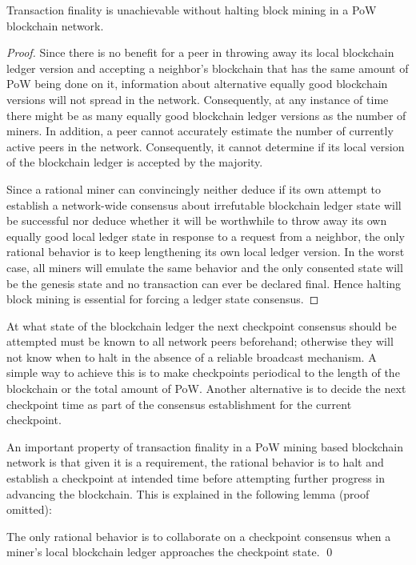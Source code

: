 \begin{lemma}
\label{l-halt}
Transaction finality is unachievable without halting block mining in a PoW blockchain network.  
\end{lemma}

\begin{proof}
Since there is no benefit for a peer in throwing away its local blockchain ledger version and accepting a neighbor's blockchain that has the same amount of PoW being done on it, information about alternative equally good blockchain versions will not spread in the network. Consequently, at any instance of time there might be as many equally good blockchain ledger versions as the number of miners. In addition, a peer cannot accurately estimate the number of currently active peers in the network. Consequently, it cannot determine if its local version of the blockchain ledger is accepted by the majority. 

Since a rational miner can convincingly neither deduce if its own attempt to establish a network-wide consensus about irrefutable blockchain ledger state will be successful nor deduce whether it will be worthwhile to throw away its own equally good local ledger state in response to a request from a neighbor, the only rational behavior is to keep lengthening its own local ledger version. In the worst case, all miners will emulate the same behavior and the only consented state will be the genesis state and no transaction can ever be declared final. Hence halting block mining is essential for forcing a ledger state consensus.             
\end{proof}                

At what state of the blockchain ledger the next checkpoint consensus should be attempted must be known to all network peers beforehand; otherwise they will not know when to halt in the absence of a reliable broadcast mechanism. A simple way to achieve this is to make checkpoints periodical to the length of the blockchain or the total amount of PoW. Another alternative is to decide the next checkpoint time as part of the consensus establishment for the current checkpoint.    

An important property of transaction finality in a PoW mining based blockchain network is that given it is a requirement, the rational behavior is to halt and establish a checkpoint at intended time before attempting further progress in advancing the blockchain. This is explained in the following lemma (proof omitted):

\begin{lemma}
\label{l-rationality}
The only rational behavior is to collaborate on a checkpoint consensus when a miner's local blockchain ledger approaches the checkpoint state. \qed       
\end{lemma}

